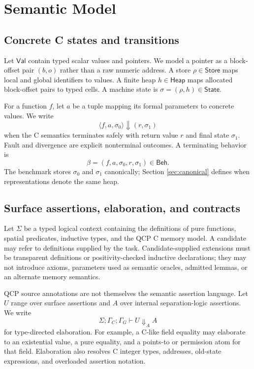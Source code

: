 \documentclass[10pt]{article}
\newcommand{\Val}{\mathsf{Val}}
\newcommand{\State}{\mathsf{State}}
\newcommand{\Heap}{\mathsf{Heap}}
\newcommand{\Store}{\mathsf{Store}}
\newcommand{\Beh}{\mathsf{Beh}}
\newcommand{\exec}{\Downarrow}
\newcommand{\ctx}{\Sigma}
\begin{document}
\section{Semantic Model}
\label{sec:model}

\subsection{Concrete C states and transitions}

Let $\Val$ contain typed scalar values and pointers.  We model a pointer as a
block-offset pair $(b,o)$ rather than a raw numeric address.  A store
$\rho\in\Store$ maps local and global identifiers to values.  A finite heap
$h\in\Heap$ maps allocated block-offset pairs to typed cells.  A machine state
is $\sigma=(\rho,h)\in\State$.

For a function $f$, let $a$ be a tuple mapping its formal parameters to
concrete values.  We write
\[
  \langle f,a,\sigma_0\rangle \exec (r,\sigma_1)
\]
when the C semantics terminates safely with return value $r$ and final state
$\sigma_1$.  Fault and divergence are explicit nonterminal outcomes.  A
terminating behavior is
\[
  \beta=(f,a,\sigma_0,r,\sigma_1)\in\Beh.
\]
The benchmark stores $\sigma_0$ and $\sigma_1$ canonically; Section
\ref{sec:canonical} defines when representations denote the same heap.

\subsection{Surface assertions, elaboration, and contracts}

Let $\ctx$ be a typed logical context containing the definitions of pure
functions, spatial predicates, inductive types, and the QCP C memory model.  A
candidate may refer to definitions supplied by the task.  Candidate-supplied
extensions must be transparent definitions or positivity-checked inductive
declarations; they may not introduce axioms, parameters used as semantic
oracles, admitted lemmas, or an alternate memory semantics.

QCP source annotations are not themselves the semantic assertion language.
Let $U$ range over surface assertions and $A$ over internal
separation-logic assertions.  We write
\[
  \ctx;\Gamma_C;\Gamma_G \vdash U \Downarrow_{\!A} A
\]
for type-directed elaboration.  For example, a C-like field equality may
elaborate to an existential value, a pure equality, and a points-to or
permission atom for that field.  Elaboration also resolves C integer types,
addresses, old-state expressions, and overloaded assertion notation.
\end{document}
